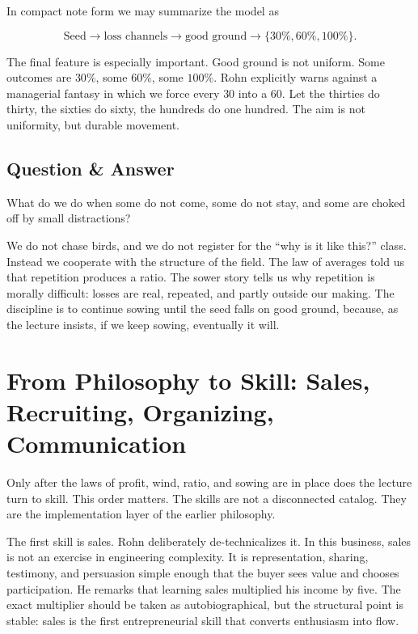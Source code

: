 In compact note form we may summarize the model as

\begin{equation}
\text{Seed} \longrightarrow \text{loss channels} \longrightarrow \text{good ground} \longrightarrow \{30\%,60\%,100\%\}.
\end{equation}

The final feature is especially important. Good ground is not uniform. Some outcomes are \(30\%\), some \(60\%\), some \(100\%\). Rohn explicitly warns against a managerial fantasy in which we force every \(30\) into a \(60\). Let the thirties do thirty, the sixties do sixty, the hundreds do one hundred. The aim is not uniformity, but durable movement.

\subsection{Question \& Answer}

What do we do when some do not come, some do not stay, and some are choked off by small distractions?

We do not chase birds, and we do not register for the ``why is it like this?'' class. Instead we cooperate with the structure of the field. The law of averages told us that repetition produces a ratio. The sower story tells us why repetition is morally difficult: losses are real, repeated, and partly outside our making. The discipline is to continue sowing until the seed falls on good ground, because, as the lecture insists, if we keep sowing, eventually it will.

\section{From Philosophy to Skill: Sales, Recruiting, Organizing, Communication}

Only after the laws of profit, wind, ratio, and sowing are in place does the lecture turn to skill. This order matters. The skills are not a disconnected catalog. They are the implementation layer of the earlier philosophy.

The first skill is sales. Rohn deliberately de-technicalizes it. In this business, sales is not an exercise in engineering complexity. It is representation, sharing, testimony, and persuasion simple enough that the buyer sees value and chooses participation. He remarks that learning sales multiplied his income by five. The exact multiplier should be taken as autobiographical, but the structural point is stable: sales is the first entrepreneurial skill that converts enthusiasm into flow.

